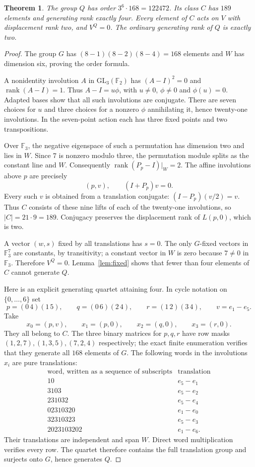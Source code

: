 \documentclass[11pt]{article}
\newtheorem{theorem}{Theorem}
\newcommand{\F}{\mathbb F}
\newcommand{\rk}{\operatorname{rank}}
\begin{document}
\begin{theorem}\label{thm:group}
The group $Q$ has order $3^6\cdot168=122472$. Its class $C$ has
$189$ elements and generating rank exactly four.
Every element of $C$ acts on $V$ with displacement rank two, and
$V^Q=0$. The ordinary generating rank of $Q$ is exactly two.
\end{theorem}
\begin{proof}
The group $G$ has $(8-1)(8-2)(8-4)=168$ elements and $W$ has dimension
six, proving the order formula.

A nonidentity involution $A$ in $\mathrm{GL}_3(\F_2)$ has
$(A-I)^2=0$ and $\rk(A-I)=1$. Thus $A-I=u\phi$, with $u\ne0$,
$\phi\ne0$ and $\phi(u)=0$. Adapted bases show that all such
involutions are conjugate. There are seven choices for $u$ and
three choices for a nonzero $\phi$ annihilating it, hence twenty-one
involutions. In the seven-point action each has three fixed points
and two transpositions.

Over $\F_3$, the negative eigenspace of such a permutation has
dimension two and lies in $W$. Since $7$ is nonzero modulo three,
the permutation module splits as the constant line and $W$.
Consequently $\rk(P_p-I)|_W=2$.
The affine involutions above $p$ are precisely
\[
                       (p,v),\qquad (I+P_p)v=0.
\]
Every such $v$ is obtained from a translation conjugate:
$(I-P_p)(v/2)=v$. Thus $C$ consists of these nine lifts of each of
the twenty-one involutions, so $|C|=21\cdot9=189$.
Conjugacy preserves the displacement rank of $L(p,0)$, which is two.

A vector $(w,s)$ fixed by all translations has $s=0$.
The only $G$-fixed vectors in $\F_3^7$ are constants, by transitivity;
a constant vector in $W$ is zero because $7\ne0$ in $\F_3$.
Therefore $V^Q=0$. Lemma~\ref{lem:fixed} shows that fewer than four
elements of $C$ cannot generate $Q$.

Here is an explicit generating quartet attaining four.
In cycle notation on $\{0,\ldots,6\}$ set
\[
 p=(0\,4)(1\,5),\qquad q=(0\,6)(2\,4),\qquad r=(1\,2)(3\,4),
 \qquad v=e_1-e_5.
\]
Take
\[
 x_0=(p,v),\qquad x_1=(p,0),\qquad
 x_2=(q,0),\qquad x_3=(r,0).
\]
They all belong to $C$. The three binary matrices for $p,q,r$
have row masks $(1,2,7),(1,3,5),(7,2,4)$ respectively;
the exact finite enumeration verifies that they generate all $168$
elements of $G$.
The following words in the involutions $x_i$ are pure translations:
\[
\begin{array}{c|c}
\text{word, written as a sequence of subscripts}&\text{translation}\\\hline
10&e_5-e_1\\
3103&e_5-e_2\\
231032&e_5-e_4\\
02310320&e_1-e_0\\
32310323&e_5-e_3\\
2023103202&e_1-e_6 .
\end{array}
\]
Their translations are independent and span $W$.
Direct word multiplication verifies every row.
The quartet therefore contains the full translation group and
surjects onto $G$, hence generates $Q$.


\end{proof}
\end{document}
